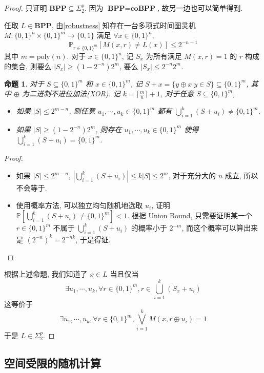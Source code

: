 \documentclass[8pt]{article}
\theoremstyle{compact}
\newtheorem{proposition}[theorem]{命题}
\def\le{\leqslant}
\def\ge{\geqslant}
\def\BPP{\textbf{BPP}}
\def\coBPP{\textbf{coBPP}}
\begin{document}
\begin{proof}
	只证明 $\BPP \subseteq \Sigma_2^p$. 因为 $\BPP = \coBPP$, 故另一边也可以简单得到.

	任取 $L \in \BPP$, 由\cref{robustness} 知存在一台多项式时间图灵机 $M: \{0, 1\}^n \times \{0, 1\}^{m} \to \{0, 1\}$ 满足 $\forall x \in \{0, 1\}^n$, $$\mathbb P_{r \in \{0, 1\}^{m}}[M(x, r) \neq L(x)] \le 2^{-n-1}$$ 其中 $m = \text{poly}(n)$. 对于 $x \in \{0, 1\}^n$, 记 $S_x$ 为所有满足 $M(x, r) = 1$ 的 $r$ 构成的集合, 则要么 $|S_x| \ge (1 - 2^{-n})2^m$, 要么 $|S_x| \le 2^{-n}2^m$.
	\begin{proposition}
		对于 $S \subseteq \{0, 1\}^m$ 和 $x \in \{0, 1\}^m$, 记 $S + x = \{y \oplus x | y \in S\} \subseteq \{0, 1\}^m$, 其中 $\oplus$ 为二进制不进位加法(XOR). 记 $k = \lceil \frac mn \rceil + 1$, 对于任意 $S \subseteq \{0, 1\}^m$, \begin{itemize}
			\item 如果 $|S| \le 2^{m-n}$, 则任意 $u_1, \cdots, u_k \in \{0, 1\}^m$ 都有 $\bigcup_{i=1}^k (S + u_i) \neq \{0, 1\}^m$.
		    \item 如果 $|S| \ge (1-2^{-n})2^m$, 则存在 $u_1, \cdots, u_k \in \{0, 1\}^m$ 使得 $\bigcup_{i=1}^k (S + u_i) = \{0, 1\}^m$.
		\end{itemize}
	\end{proposition}
	\begin{proof}
		\begin{itemize}
			\item 如果 $|S| \le 2^{m-n}$, $\left|\bigcup_{i=1}^k (S + u_i)\right| \le k|S| \le 2^m$, 对于充分大的 $n$ 成立, 所以不会等于.
		   \item 使用概率方法, 可以独立均匀随机地选取 $u_i$, 证明 $\mathbb P\left[\bigcup_{i=1}^k (S + u_i) \neq \{0, 1\}^m\right] < 1$. 根据 Union Bound, 只需要证明某一个 $r \in \{0, 1\}^m$ 不属于 $\bigcup_{i=1}^k (S + u_i)$ 的概率小于 $2^{-m}$, 而这个概率可以算出来是 $(2^{-n})^k = 2^{-nk}$, 于是得证.
		\end{itemize}
	\end{proof}

	根据上述命题, 我们知道了 $x \in L$ 当且仅当 $$\exists u_1, \cdots, u_k, \forall r \in \{0, 1\}^m, r \in \bigcup_{i=1}^k (S_x + u_i)$$ 这等价于 $$\exists u_1, \cdots, u_k, \forall r \in \{0, 1\}^m, \bigvee_{i=1}^k M(x, r \oplus u_i) = 1$$ 于是 $L \in \Sigma_2^p$.
\end{proof}

\subsection{空间受限的随机计算}
\def\BPL{\textbf{BPL}}
\def\RL{\textbf{RL}}
\end{document}

